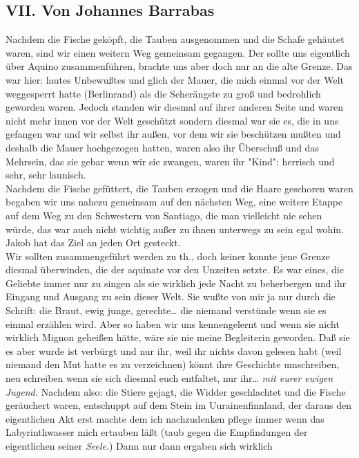 \documentclass[
]{article}
\author{}
\date{\vspace{-2.5em}}
\begin{document}
\subsection{VII. Von Johannes
Barrabas}\label{vii.-von-johannes-barrabas}

Nachdem die Fische geköpft, die Tauben ausgenommen und die Schafe
gehäutet waren, sind wir einen weitern Weg gemeinsam gegangen. Der
sollte uns eigentlich über Aquino zusammenführen, brachte uns aber doch
nur an die alte Grenze. Das war hier: lautes Unbewußtes und glich der
Mauer, die mich einmal vor der Welt weggesperrt hatte (Berlinrand) als
die Seherängste zu groß und bedrohlich geworden waren. Jedoch standen
wir diesmal auf ihrer anderen Seite und waren nicht mehr innen vor der
Welt geschützt sondern diesmal war sie es, die in uns gefangen war und
wir selbst ihr außen, vor dem wir sie beschützen mußten und deshalb die
Mauer hochgezogen hatten, waren also ihr Überschuß und das Mehrsein, das
sie gebar wenn wir sie zwangen, waren ihr "Kind": herrisch und sehr,
sehr launisch.\\
Nachdem die Fische gefüttert, die Tauben erzogen und die Haare geschoren
waren begaben wir uns nahezu gemeinsam auf den nächsten Weg, eine
weitere Etappe auf dem Weg zu den Schwestern von Santiago, die man
vielleicht nie sehen würde, das war auch nicht wichtig außer zu ihnen
unterwegs zu sein egal wohin. Jakob hat das Ziel an jeden Ort
gesteckt.\\
Wir sollten zusammengeführt werden zu th., doch keiner konnte jene
Grenze diesmal überwinden, die der aquinate vor den Unzeiten setzte. Es
war eines, die Geliebte immer nur zu singen als sie wirklich jede Nacht
zu beherbergen und ihr Eingang und Ausgang zu sein dieser Welt. Sie
wußte von mir ja nur durch die Schrift: die Braut, ewig junge,
gerechte\ldots{} die niemand verstünde wenn sie es einmal erzählen wird.
Aber so haben wir uns kennengelernt und wenn sie nicht wirklich Mignon
geheißen hätte, wäre sie nie meine Begleiterin geworden. Daß sie es aber
wurde ist verbürgt und nur ihr, weil ihr nichts davon gelesen habt (weil
niemand den Mut hatte es zu verzeichnen) könnt ihre Geschichte
umschreiben, neu schreiben wenn sie sich diesmal euch entfaltet, nur
ihr\ldots{} \emph{mit eurer ewigen Jugend. }Nachdem also: die Stiere
gejagt, die Widder geschlachtet und die Fische geräuchert waren,
entschuppt auf dem Stein im Uurainenfinnland, der daraus den
eigentlichen Akt erst machte dem ich nachzudenken pflege immer wenn das
Labyrinthwasser mich ertauben läßt (taub gegen die Empfindungen der
eigentlichen seiner \emph{Seele}.) Dann nur dann ergaben sich wirklich
\end{document}
